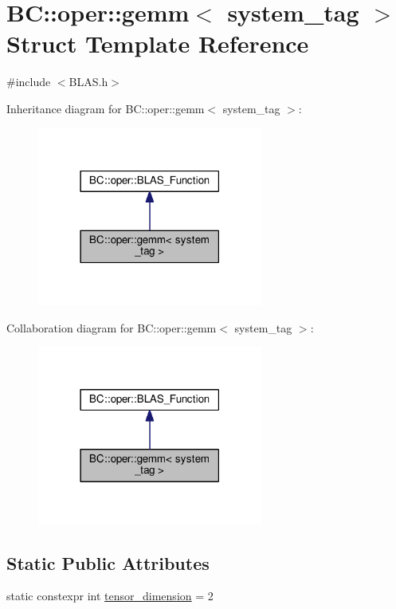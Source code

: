\hypertarget{structBC_1_1oper_1_1gemm}{}\section{BC\+:\+:oper\+:\+:gemm$<$ system\+\_\+tag $>$ Struct Template Reference}
\label{structBC_1_1oper_1_1gemm}


{\ttfamily \#include $<$B\+L\+A\+S.\+h$>$}



Inheritance diagram for BC\+:\+:oper\+:\+:gemm$<$ system\+\_\+tag $>$\+:
\nopagebreak
\begin{figure}[H]
\begin{center}
\leavevmode
\includegraphics[width=210pt]{structBC_1_1oper_1_1gemm__inherit__graph}
\end{center}
\end{figure}


Collaboration diagram for BC\+:\+:oper\+:\+:gemm$<$ system\+\_\+tag $>$\+:
\nopagebreak
\begin{figure}[H]
\begin{center}
\leavevmode
\includegraphics[width=210pt]{structBC_1_1oper_1_1gemm__coll__graph}
\end{center}
\end{figure}
\subsection*{Static Public Attributes}
\begin{DoxyCompactItemize}
\item 
static constexpr int \hyperlink{structBC_1_1oper_1_1gemm_a01656da4d69b2fd870def1c369ecf63f}{tensor\+\_\+dimension} = 2
\end{DoxyCompactItemize}


